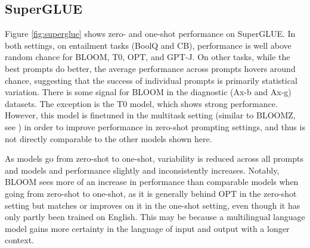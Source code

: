 \documentclass[twoside,11pt]{article}
\begin{document}

\subsection{SuperGLUE}
\label{sec:eval:superglue}

Figure \ref{fig:superglue} shows zero- and one-shot performance on SuperGLUE. In both settings, on entailment tasks (BoolQ and CB), performance is well above random chance for BLOOM, T0, OPT, and GPT-J. On other tasks, while the best prompts do better, the average performance across prompts hovers around chance, suggesting that the success of individual prompts is primarily statistical variation. There is some signal for BLOOM in the diagnostic (Ax-b and Ax-g) datasets. The exception is the T0 model, which shows strong performance. However, this model is finetuned in the multitask setting (similar to BLOOMZ, see ) in order to improve performance in zero-shot prompting settings, and thus is not directly comparable to the other models shown here. 

As models go from zero-shot to one-shot, variability is reduced across all prompts and models and performance slightly and inconsistently increases. Notably, BLOOM sees more of an increase in performance than comparable models when going from zero-shot to one-shot, as it is generally behind OPT in the zero-shot setting but matches or improves on it in the one-shot setting, even though it has only partly been trained on English. This may be because a multilingual language model gains more certainty in the language of input and output with a longer context.
\end{document}
